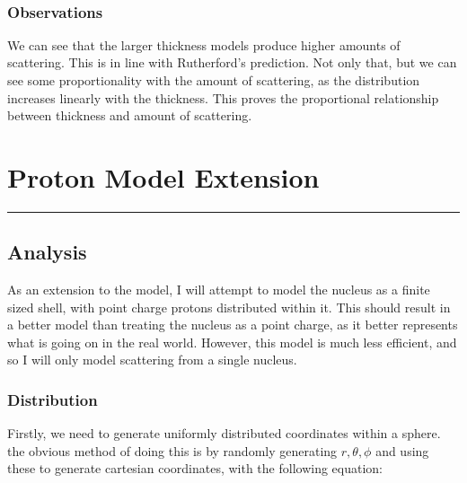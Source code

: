 \documentclass[11pt]{article}
\begin{document}
    \begin{center}
    \end{center}
    { \hspace*{\fill} \\}
    
    \hypertarget{observations}{%
\subsubsection*{Observations}\label{observations}}

We can see that the larger thickness models produce higher amounts of
scattering. This is in line with Rutherford's prediction. Not only that,
but we can see some proportionality with the amount of scattering, as
the distribution increases linearly with the thickness. This proves the
proportional relationship between thickness and amount of scattering.

    \hypertarget{proton-model-extension}{%
\section{Proton Model Extension}\label{proton-model-extension}}

\begin{center}\rule{0.5\linewidth}{0.5pt}\end{center}

\hypertarget{analysis}{%
\subsection{Analysis}\label{analysis}}

As an extension to the model, I will attempt to model the nucleus as a
finite sized shell, with point charge protons distributed within it.
This should result in a better model than treating the nucleus as a
point charge, as it better represents what is going on in the real
world. However, this model is much less efficient, and so I will only
model scattering from a single nucleus.

\hypertarget{distribution}{%
\subsubsection{Distribution}\label{distribution}}

Firstly, we need to generate uniformly distributed coordinates within a
sphere. the obvious method of doing this is by randomly generating
\(r, \theta, \phi\) and using these to generate cartesian coordinates,
with the following equation:
\end{document}
